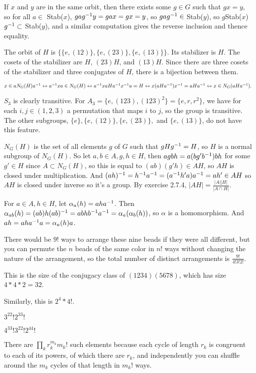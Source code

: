 \documentclass[11pt, oneside]{article}   	%
\begin{document}
If $x$ and $y$ are in the same orbit, then there exists some $g \in G$ such that $gx = y$, so for all $a \in $ Stab($x$), $gag^{-1} y = gax = gx = y$, so $gag^{-1} \in $ Stab($y$), so $g$Stab($x$)$g^{-1} \subset$ Stab($y$), and a similar computation gives the reverse inclusion and thence equality.
\item The orbit of $H$ is $\{\{e, (12)\}, \{e, (23)\}, \{e, (13)\}\}$. Its stabilizer is $H$. The cosets of the stabilizer are $H$, $(23)H$, and $(13)H$. Since there are three cosets of the stabilizer and three conjugates of $H$, there is a bijection between them.
\item $x \in aN_G(H)a^{-1} \leftrightarrow a^{-1} xa \in N_G(H) \leftrightarrow a^{-1} x a H a^{-1} x^{-1} a = H\leftrightarrow x(aHa^{-1})x^{-1} = aHa^{-1} \leftrightarrow x \in N_G(aHa^{-1}).$
\item $S_3$ is clearly transitive. For $A_3 = \{e, (123), (123)^2\} = \{e, r, r^2\}$, we have for each $i, j \in (1, 2, 3)$ a permutation that maps $i$ to $j$, so the group is transitive. The other subgroups, $\{e\}, \{e, (12)\}, \{e, (23)\}, $ and $\{e, (13)\}$, do not have this feature.
\item $N_G(H)$ is the set of all elements $g$ of $G$ such that $gHg^{-1} = H$, so $H$ is a normal subgroup of $N_G(H)$. So let $a, b \in A, g, h \in H$, then $agbh = a(bg'b^{-1})bh$ for some $g' \in H$ since $A \subset N_G(H)$, so this is equal to $(ab)(g'h) \in AH$, so $AH$ is closed under multiplication. And $(ah)^{-1} = h^{-1} a^{-1} = (a^{-1} h'a)a^{-1} = ah' \in AH$ so $AH$ is closed under inverse so it's a group. By exercise 2.7.4, $|AH| = \frac{|A||H|}{|A \cap H|}$.
\item For $a \in A, h \in H$, let $\alpha_a(h) = aha^{-1}$. Then $\alpha_{ab}(h) = (ab)h(ab)^{-1} = abhb^{-1} a^{-1} = \alpha_a(\alpha_b(h))$, so $\alpha$ is a homomorphism. And $ah = aha^{-1} a = \alpha_a(h)a$.
\item There would be $9!$ ways to arrange these nine beads if they were all different, but you can permute the $n$ beads of the same color in $n!$ ways without changing the nature of the arrangement, so the total number of distinct arrangements is $\frac{9!}{4!3!2!}$.
\item This is the size of the conjugacy class of $(1234)(5678)$, which has size $4*4*2 = 32$.
\item Similarly, this is $2^4 * 4!$.
\item $3^22!2^33!$
\item $4^33!3^22!2^44!$
\item There are $\prod_kr_k^{m_k}m_k!$ such elements because each cycle of length $r_k$ is congruent to each of its powers, of which there are $r_k$, and independently you can shuffle around the $m_k$ cycles of that length in $m_k!$ ways.
\end{document}

